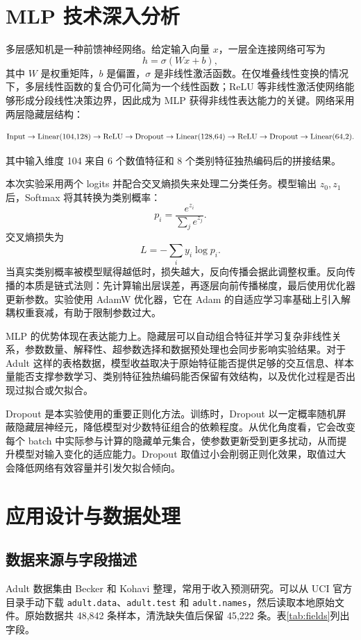 \documentclass[UTF8,a4paper,12pt]{ctexart}
\begin{document}
\section{MLP 技术深入分析}
多层感知机是一种前馈神经网络。给定输入向量 $x$，一层全连接网络可写为
\[
h = \sigma(Wx + b),
\]
其中 $W$ 是权重矩阵，$b$ 是偏置，$\sigma$ 是非线性激活函数。在仅堆叠线性变换的情况下，多层线性函数的复合仍可化简为一个线性函数；ReLU 等非线性激活使网络能够形成分段线性决策边界，因此成为 MLP 获得非线性表达能力的关键。网络采用两层隐藏层结构：

\[
\text{Input} \rightarrow \text{Linear(104,128)} \rightarrow \text{ReLU} \rightarrow \text{Dropout}\rightarrow \text{Linear(128,64)} \rightarrow \text{ReLU} 
\\
\rightarrow \text{Dropout}
\rightarrow \text{Linear(64,2)}.
\]

其中输入维度 104 来自 6 个数值特征和 8 个类别特征独热编码后的拼接结果。

本次实验采用两个 logits 并配合交叉熵损失来处理二分类任务。模型输出 $z_0,z_1$ 后，Softmax 将其转换为类别概率：
\[
p_i=\frac{e^{z_i}}{\sum_j e^{z_j}}.
\]
交叉熵损失为
\[
L=-\sum_i y_i\log p_i.
\]
当真实类别概率被模型赋得越低时，损失越大，反向传播会据此调整权重。反向传播的本质是链式法则：先计算输出层误差，再逐层向前传播梯度，最后使用优化器更新参数。实验使用 AdamW 优化器，它在 Adam 的自适应学习率基础上引入解耦权重衰减，有助于限制参数过大。

MLP 的优势体现在表达能力上。隐藏层可以自动组合特征并学习复杂非线性关系，参数数量、解释性、超参数选择和数据预处理也会同步影响实验结果。对于 Adult 这样的表格数据，模型收益取决于原始特征能否提供足够的交互信息、样本量能否支撑参数学习、类别特征独热编码能否保留有效结构，以及优化过程是否出现过拟合或欠拟合。

Dropout 是本实验使用的重要正则化方法\cite{srivastava2014dropout}。训练时，Dropout 以一定概率随机屏蔽隐藏层神经元，降低模型对少数特征组合的依赖程度。从优化角度看，它会改变每个 batch 中实际参与计算的隐藏单元集合，使参数更新受到更多扰动，从而提升模型对输入变化的适应能力。Dropout 取值过小会削弱正则化效果，取值过大会降低网络有效容量并引发欠拟合倾向。 

\section{应用设计与数据处理}
\subsection{数据来源与字段描述}
Adult 数据集由 Becker 和 Kohavi 整理，常用于收入预测研究\cite{kohavi1996scaling}。可以从 UCI 官方目录手动下载 \texttt{adult.data}、\texttt{adult.test} 和 \texttt{adult.names}，然后读取本地原始文件。原始数据共 48,842 条样本，清洗缺失值后保留 45,222 条。表\ref{tab:fields}列出字段。
\end{document}
